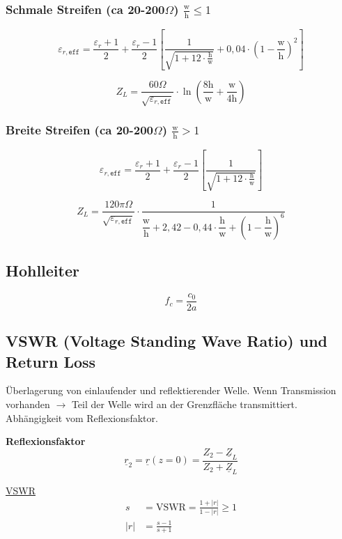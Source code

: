\subsubsection[Schmale Streifen]{Schmale Streifen (ca 20-200$\Omega$) $\frac{\mathrm{w}}{\mathrm{h}}\leq 1$}
\[
	\varepsilon_{r,\texttt{eff}}  = \frac{\varepsilon_r+1}{2} + \frac{\varepsilon_r-1}{2}
  \left[\frac{1}{\sqrt{1+12\cdot\frac{\mathrm{h}}{\mathrm{w}}}} +
  0,04\cdot\left(1-\frac{\mathrm{w}}{\mathrm{h}}\right)^2\right]
\]

\[
	Z_L = \frac{60\Omega}{\sqrt{\varepsilon_{r,\texttt{eff}}}}\cdot\ln\left(\frac{8\mathrm{h}}{\mathrm{w}}+\frac{\mathrm{w}}{4\mathrm{h}}\right)
\]

\subsubsection[Breite Streifen]{Breite Streifen (ca 20-200$\Omega$) $\frac{\mathrm{w}}{\mathrm{h}} > 1$}
\[
	\varepsilon_{r,\texttt{eff}}  = \frac{\varepsilon_r+1}{2} + \frac{\varepsilon_r-1}{2}
  \left[\frac{1}{\sqrt{1+12\cdot\frac{\mathrm{h}}{\mathrm{w}}}}\right]
\]

\[
	Z_L = \frac{120\pi\Omega}{\sqrt{\varepsilon_{r,\texttt{eff}}}}\cdot\frac{1}{\dfrac{\mathrm{w}}{\mathrm{h}}+2,42-0,44\cdot\dfrac{\mathrm{h}}{\mathrm{w}}+\left(1-\dfrac{\mathrm{h}}{\mathrm{w}}\right)^6}
\]

\subsection{Hohlleiter}
\[
	f_c = \frac{c_0}{2a}
\]

\subsection{VSWR (Voltage Standing Wave Ratio) und Return Loss}\label{sec:VSWR}

Überlagerung von einlaufender und reflektierender Welle. Wenn Transmission
vorhanden $\rightarrow$ Teil der Welle wird an der Grenzfläche transmittiert.
Abhängigkeit vom Reflexionsfaktor.

\textbf{Reflexionsfaktor}
\[
	\underline{r}_2 = \underline{r}(z=0) = \frac{Z_2 - \underline{Z}_L}{Z_2 + \underline{Z}_L}
\]

\underline{VSWR}
\begin{align*}
	s   & = \mathrm{VSWR} = \frac{1+|r|}{1-|r|}\geq 1 \\
	|r| & = \frac{s-1}{s+1}
\end{align*}


